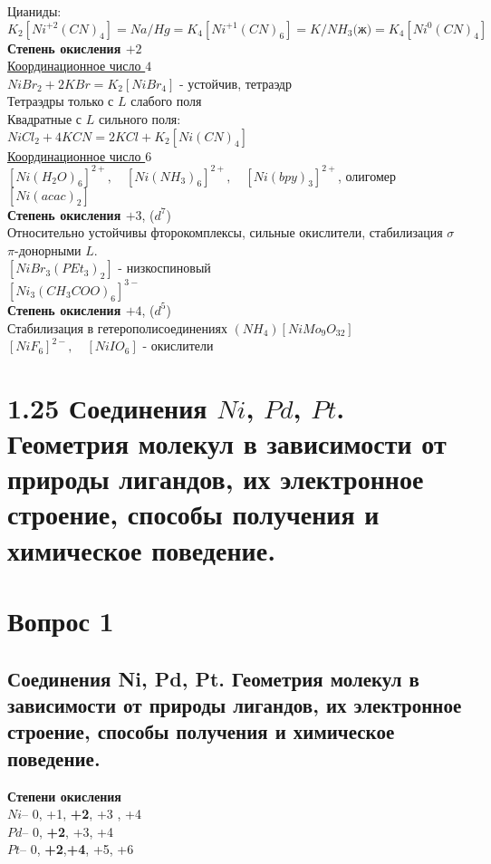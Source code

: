 Цианиды:
\[
K_2\left[Ni^{+2}(CN)_4 \right] = Na/Hg = K_4\left[Ni^{+1}(CN)_6 \right] = K/NH_3\text{(ж)} = K_4\left[Ni^{0}(CN)_4 \right]
\]
\textbf{Степень окисления $+2$}\\
\ul{Координационное число $4$} \\
$NiBr_2 + 2KBr = K_2\left[NiBr_4 \right]$ - устойчив, тетраэдр \\
Тетраэдры только с $L$ слабого поля \\
Квадратные с $L$ сильного поля: \\
$NiCl_2 + 4 KCN = 2 KCl + K_2\left[Ni(CN)_4 \right]$ \\
\ul{Координационное число $6$} \\
$\left[Ni(H_2O)_6 \right]^{2+}, \quad \left[Ni(NH_3)_6 \right]^{2+}, \quad \left[Ni(bpy)_3 \right]^{2+}$, олигомер $\left[Ni(acac)_2 \right]$ \\
\textbf{Степень окисления $+3$}, ($d^7$)\\
Относительно устойчивы фторокомплексы, сильные окислители, стабилизация $\sigma$ $\pi$-донорными $L$. \\
$ \left[NiBr_3(PEt_3)_2 \right] $ - низкоспиновый \\
$ \left[Ni_3(CH_3COO)_6 \right]^{3-} $ \\
\textbf{Степень окисления $+4$}, ($d^5$)\\
Стабилизация в гетерополисоединениях $(NH_4)\left[NiMo_9O_{32}\right]$ \\
$\left[NiF_6\right]^{2-}, \quad \left[NiIO_6\right]$ - окислители

\section*{1.25 Соединения $Ni$, $Pd$, $Pt$. Геометрия молекул в зависимости от природы лигандов, их электронное строение, способы получения и химическое поведение.}
\section{Вопрос 1}
\subsection{ Соединения Ni, Pd, Pt. Геометрия молекул в зависимости от природы лигандов, их электронное строение, способы получения и химическое поведение.}

\textbf{Степени окисления}\\
$Ni$-- 0, +1, \textbf{+2}, +3 , +4\\
$Pd$-- 0, \textbf{+2}, +3, +4\\
$Pt$-- 0, \textbf{+2},\textbf{+4}, +5, +6

